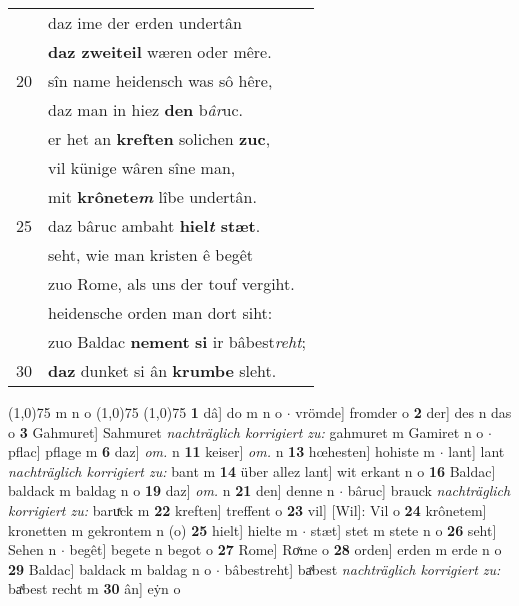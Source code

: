 \documentclass[8pt,a4paper,notitlepage]{article}
\begin{document}
\begin{table}[ht]
\begin{minipage}[t]{0.5\linewidth}
\begin{tabular}{rl}
 & daz ime der erden undertân\\ 
 & \textbf{daz zweiteil} wæren oder mêre.\\ 
20 & sîn name heidensch was sô hêre,\\ 
 & daz man in hiez \textbf{den} b\textit{âr}uc.\\ 
 & er het an \textbf{kreften} solichen \textbf{zuc},\\ 
 & vil künige wâren sîne man,\\ 
 & mit \textbf{krônete\textit{m}} lîbe undertân.\\ 
25 & daz bâruc ambaht \textbf{hiel\textit{t} stæt}.\\ 
 & seht, wie man kristen ê begêt\\ 
 & zuo Rome, als uns der touf vergiht.\\ 
 & heidensche orden man dort siht:\\ 
 & zuo Baldac \textbf{nement} \textbf{si} ir bâbest\textit{reht};\\ 
30 & \textbf{daz} dunket si ân \textbf{krumbe} sleht.\\ 
\end{tabular}
\scriptsize
\line(1,0){75} \newline
m n o \newline
\line(1,0){75} \newline
\newline
\line(1,0){75} \newline
\textbf{1} dâ] do m n o  $\cdot$ vrömde] fromder o \textbf{2} der] des n das o \textbf{3} Gahmuret] Sahmuret \textit{nachträglich korrigiert zu:} gahmuret m Gamiret n o  $\cdot$ pflac] pflage m \textbf{6} daz] \textit{om.} n \textbf{11} keiser] \textit{om.} n \textbf{13} hœhesten] hohiste m  $\cdot$ lant] lant \textit{nachträglich korrigiert zu:} bant m \textbf{14} über allez lant] wit erkant n o \textbf{16} Baldac] baldack m baldag n o \textbf{19} daz] \textit{om.} n \textbf{21} den] denne n  $\cdot$ bâruc] brauck \textit{nachträglich korrigiert zu:} baruͯck m \textbf{22} kreften] treffent o \textbf{23} vil] [Wil]: Vil o \textbf{24} krônetem] kronetten m gekrontem n (o) \textbf{25} hielt] hielte m  $\cdot$ stæt] stet m stete n o \textbf{26} seht] Sehen n  $\cdot$ begêt] begete n begot o \textbf{27} Rome] Roͯme o \textbf{28} orden] erden m erde n o \textbf{29} Baldac] baldack m baldag n o  $\cdot$ bâbestreht] baͯbest \textit{nachträglich korrigiert zu:} baͯbest recht m \textbf{30} ân] eẏn o \newline
\end{minipage}
\end{table}
\end{document}
